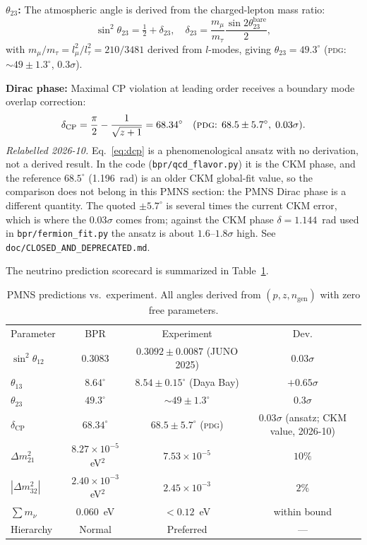 \documentclass[aps,prd,twocolumn,superscriptaddress,longbibliography,nofootinbib]{revtex4-2}
\begin{document}
\textbf{$\theta_{23}$:} The atmospheric angle is derived from the
charged-lepton mass ratio:
\begin{equation}
\sin^2\theta_{23} = \tfrac{1}{2} + \delta_{23},
\quad \delta_{23} = \frac{m_\mu}{m_\tau}\frac{\sin 2\theta_{23}^{\mathrm{bare}}}{2},
\end{equation}
with $m_\mu/m_\tau = l_\mu^2/l_\tau^2 = 210/3481$ derived from $l$-modes,
giving $\theta_{23} = 49.3^\circ$ (\textsc{pdg}: $\sim49 \pm 1.3^\circ$,
$0.3\sigma$).

\textbf{Dirac phase:} Maximal CP violation at leading order receives a
boundary mode overlap correction:
\begin{equation}
\delta_{\mathrm{CP}} = \frac{\pi}{2} - \frac{1}{\sqrt{z+1}}
= 68.34^\circ
\label{eq:dcp}
\quad (\text{\textsc{pdg}: }68.5 \pm 5.7^\circ,\; 0.03\sigma).
\end{equation}
\textit{Relabelled 2026-10.}  Eq.~\eqref{eq:dcp} is a
phenomenological ansatz with no derivation, not a derived result.  In
the code (\texttt{bpr/qcd\_flavor.py}) it is the CKM phase, and the
reference $68.5^\circ$ (1.196~rad) is an older CKM global-fit value, so
the comparison does not belong in this PMNS section: the PMNS Dirac
phase is a different quantity.  The quoted $\pm5.7^\circ$ is several
times the current CKM error, which is where the $0.03\sigma$ comes
from; against the CKM phase $\delta = 1.144$~rad used in
\texttt{bpr/fermion\_fit.py} the ansatz is about $1.6$--$1.8\sigma$
high.  See \texttt{doc/CLOSED\_AND\_DEPRECATED.md}.

The neutrino prediction scorecard is summarized in Table~\ref{tab:pmns}.

\begin{table}[h]
\caption{\label{tab:pmns}%
PMNS predictions vs.\ experiment.  All angles derived from
$(p, z, n_{\mathrm{gen}})$ with zero free parameters.}
\begin{ruledtabular}
\begin{tabular}{lccc}
Parameter & BPR & Experiment & Dev.\\
\colrule
$\sin^2\theta_{12}$ & 0.3083 & $0.3092\pm0.0087$ (JUNO 2025) & $0.03\sigma$ \\
$\theta_{13}$ & $8.64^\circ$ & $8.54\pm0.15^\circ$ (Daya Bay) & $+0.65\sigma$ \\
$\theta_{23}$ & $49.3^\circ$ & $\sim49\pm1.3^\circ$ & $0.3\sigma$ \\
$\delta_{\mathrm{CP}}$ & $68.34^\circ$ & $68.5\pm5.7^\circ$ (\textsc{pdg}) & $0.03\sigma$ (ansatz; CKM value, 2026-10) \\
$\Delta m^2_{21}$ & $8.27\times10^{-5}$~eV$^2$ & $7.53\times10^{-5}$ & $10\%$ \\
$|\Delta m^2_{32}|$ & $2.40\times10^{-3}$~eV$^2$ & $2.45\times10^{-3}$ & $2\%$ \\
$\sum m_\nu$ & $0.060$~eV & $< 0.12$~eV & within bound \\
Hierarchy & Normal & Preferred & --- \\
\end{tabular}
\end{ruledtabular}
\end{table}
\end{document}

